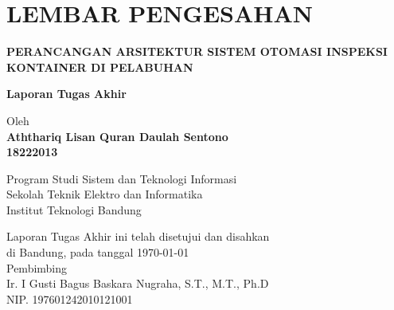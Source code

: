 \chapter*{LEMBAR PENGESAHAN}

\begin{center}
  \vspace{2cm}
    
  {\large\bfseries PERANCANGAN ARSITEKTUR SISTEM OTOMASI INSPEKSI KONTAINER DI PELABUHAN}\\
     \vspace{2cm}

  {\Large \textbf{Laporan Tugas Akhir}}\\


  \vspace{1.5cm}
    
    
  {\large Oleh}\\[0.3cm]
    \textbf{
    {\large Aththariq Lisan Quran Daulah Sentono}\\
    {\large 18222013}
  }\\
    
  \vspace{0.5cm}
 
  {\large Program Studi Sistem dan Teknologi Informasi}\\
  {\large Sekolah Teknik Elektro dan Informatika}\\
  {\large Institut Teknologi Bandung}\\

  \vspace{1.5cm}

  Laporan Tugas Akhir ini telah disetujui dan disahkan\\ 
  di Bandung, pada tanggal \today\\[1cm]

	Pembimbing  \\[3cm]
	Ir. I Gusti Bagus Baskara Nugraha, S.T., M.T., Ph.D  \\[0.2cm]
	NIP. 197601242010121001 

\end{center}

\vspace{1cm}
\noindent


